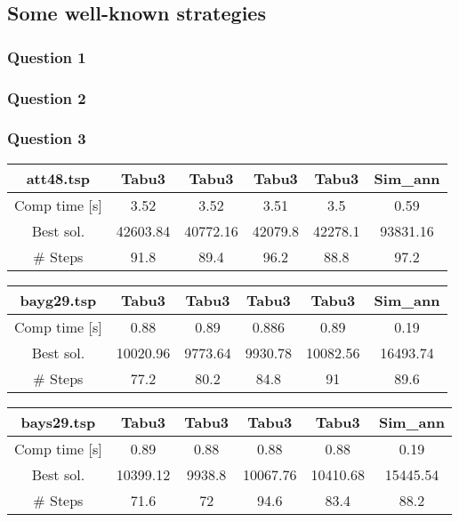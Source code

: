 \documentclass[a4paper,10pt]{article}
\begin{document}
\subsection{Some well-known strategies}
\subsubsection{Question 1}
\subsubsection{Question 2}
\subsubsection{Question 3}

\begin{center}
\begin{tabular}{|c|c|c|c|c|c|}
\hline 
att48.tsp & Tabu3 & Tabu3 & Tabu3 & Tabu3 & Sim\_ann \\ 
\hline 
Comp time [s] & 3.52 & 3.52 & 3.51 & 3.5 & 0.59 \\ 
\hline 
Best sol. & 42603.84 & 40772.16 & 42079.8 & 42278.1 & 93831.16 \\ 
\hline 
\# Steps & 91.8 & 89.4 & 96.2 & 88.8 & 97.2 \\ 
\hline 
\end{tabular} 
\end{center}

\begin{center}
\begin{tabular}{|c|c|c|c|c|c|}
\hline 
bayg29.tsp & Tabu3 & Tabu3 & Tabu3 & Tabu3 & Sim\_ann\\ 
\hline 
Comp time [s] & 0.88 & 0.89 & 0.886 & 0.89 & 0.19 \\ 
\hline 
Best sol. & 10020.96 & 9773.64 & 9930.78 & 10082.56 & 16493.74 \\ 
\hline 
\# Steps & 77.2 & 80.2 & 84.8 & 91 & 89.6 \\ 
\hline 
\end{tabular} 
\end{center}

\begin{center}
\begin{tabular}{|c|c|c|c|c|c|}
\hline 
bays29.tsp & Tabu3 & Tabu3 & Tabu3 & Tabu3 & Sim\_ann\\ 
\hline 
Comp time [s] & 0.89 & 0.88 & 0.88 & 0.88 & 0.19 \\ 
\hline 
Best sol. & 10399.12 & 9938.8 & 10067.76 & 10410.68 & 15445.54 \\ 
\hline 
\# Steps & 71.6 & 72 & 94.6 & 83.4 & 88.2 \\ 
\hline 
\end{tabular} 
\end{center}
\end{document}
